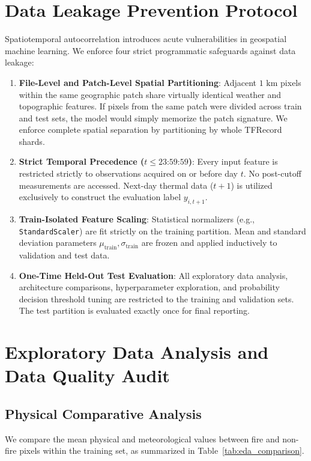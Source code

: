 \documentclass[10pt,journal,compsoc]{IEEEtran}
\begin{document}
\section{Data Leakage Prevention Protocol}
Spatiotemporal autocorrelation introduces acute vulnerabilities in geospatial machine learning. We enforce four strict programmatic safeguards against data leakage:
\begin{enumerate}
    \item \textbf{File-Level and Patch-Level Spatial Partitioning}: Adjacent $1\text{ km}$ pixels within the same geographic patch share virtually identical weather and topographic features. If pixels from the same patch were divided across train and test sets, the model would simply memorize the patch signature. We enforce complete spatial separation by partitioning by whole TFRecord shards.
    \item \textbf{Strict Temporal Precedence ($t \le \text{23:59:59}$)}: Every input feature is restricted strictly to observations acquired on or before day $t$. No post-cutoff measurements are accessed. Next-day thermal data ($t+1$) is utilized exclusively to construct the evaluation label $y_{i, t+1}$.
    \item \textbf{Train-Isolated Feature Scaling}: Statistical normalizers (e.g., \texttt{StandardScaler}) are fit strictly on the training partition. Mean and standard deviation parameters $\mu_{\text{train}}, \sigma_{\text{train}}$ are frozen and applied inductively to validation and test data.
    \item \textbf{One-Time Held-Out Test Evaluation}: All exploratory data analysis, architecture comparisons, hyperparameter exploration, and probability decision threshold tuning are restricted to the training and validation sets. The test partition is evaluated exactly once for final reporting.
\end{enumerate}

\section{Exploratory Data Analysis and Data Quality Audit}

\subsection{Physical Comparative Analysis}
We compare the mean physical and meteorological values between fire and non-fire pixels within the training set, as summarized in Table~\ref{tab:eda_comparison}.
\end{document}
